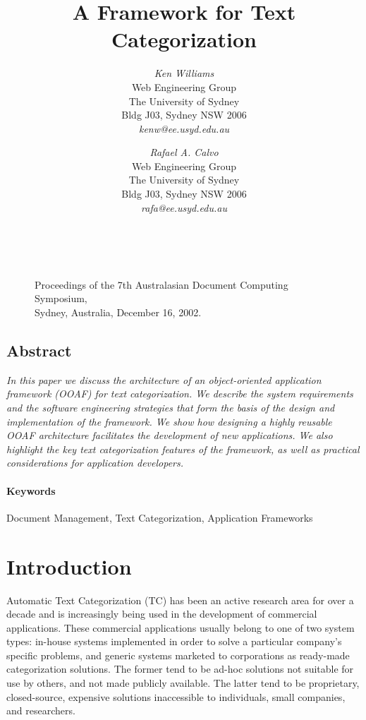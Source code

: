 \documentclass[twocolumn]{article}
\title{A Framework for Text Categorization}
\author{
{\em Ken Williams}\\[1ex]
Web Engineering Group\\
The University of Sydney\\
Bldg J03, Sydney NSW 2006\\[1ex]
{\em kenw@ee.usyd.edu.au}
\and
{\em Rafael A. Calvo}\\[1ex]
Web Engineering Group\\
The University of Sydney\\
Bldg J03, Sydney NSW 2006\\[1ex]
{\em rafa@ee.usyd.edu.au}
}
\date{}
\begin{document}
\maketitle
\thispagestyle{empty}


        \begin{figure}[b]
	~\\
        \noindent
        {\small\bf\raggedright
        Proceedings of the 7th Australasian 
	Document Computing Symposium,\\
	Sydney, Australia,
        December 16, 2002.
        }
        \end{figure}


\subsection*{\centering Abstract}
\noindent
{\it 
In this paper we discuss the architecture of an object-oriented
application framework (OOAF) for text categorization. We describe the
system requirements and the software engineering strategies that
form the basis of the design and implementation of the framework.  We show how
designing a highly reusable OOAF architecture facilitates the
development of new applications.  We also highlight the key text
categorization features of the framework, as well as practical
considerations for application developers.
}

\paragraph{Keywords} 
Document Management, Text Categorization, Application Frameworks


\section{Introduction}

Automatic Text Categorization (TC) has been an active research area
for over a decade and is increasingly being used in the development of
commercial applications.  These commercial applications usually belong to
one of two system types: in-house systems implemented in order to
solve a particular company's specific problems, and generic systems marketed to
corporations as ready-made categorization solutions.  The former tend
to be ad-hoc solutions not suitable for use by others, and not made
publicly available.  The
latter tend to be proprietary, closed-source, expensive solutions
inaccessible to individuals, small companies, and researchers.
\end{document}
